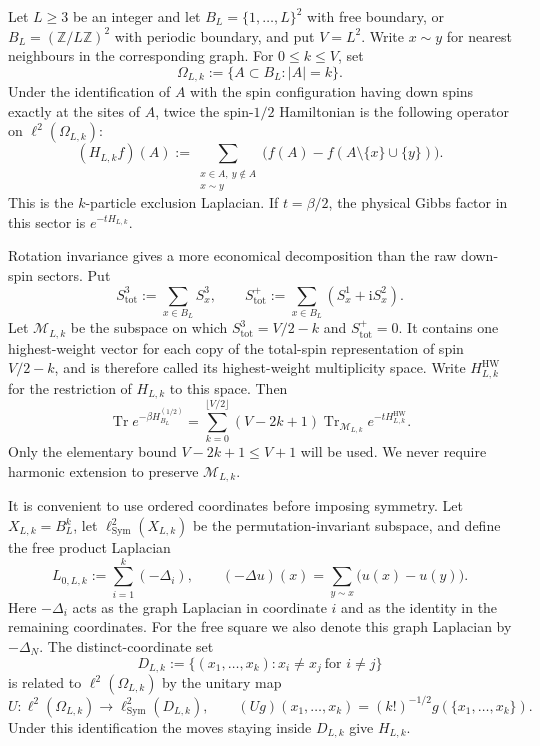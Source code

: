 \documentclass[11pt]{article}
\numberwithin{equation}{section}
\theoremstyle{remark}
\newcommand{\Z}{\mathbb Z}
\newcommand{\Tr}{\operatorname{Tr}}
\newcommand{\1}{\mathbf 1}
\newcommand{\cM}{\mathcal M}
\newcommand{\Sym}{\operatorname{Sym}}
\newcommand{\HW}{\mathrm{HW}}
\begin{document}
Let \(L\geq3\) be an integer and let
\(B_L=\{1,\ldots,L\}^2\) with free boundary, or
\(B_L=(\Z/L\Z)^2\) with periodic boundary, and put \(V=L^2\).  Write
\(x\sim y\) for nearest neighbours in the corresponding graph.  For
\(0\leq k\leq V\), set
\[
 \Omega_{L,k}:=\{A\subset B_L:|A|=k\}.
\]
Under the identification of \(A\) with the spin configuration having down
spins exactly at the sites of \(A\), twice the spin-\(1/2\) Hamiltonian is
the following operator on \(\ell^2(\Omega_{L,k})\):
\begin{equation}
 (H_{L,k}f)(A)
 :=\sum_{\substack{x\in A,\ y\notin A\\x\sim y}}
 \bigl(f(A)-f(A\setminus\{x\}\cup\{y\})\bigr).
 \label{eq:exclusion-laplacian}
\end{equation}
This is the \(k\)-particle exclusion Laplacian.  If \(t=\beta/2\), the
physical Gibbs factor in this sector is
\(e^{-tH_{L,k}}\).

Rotation invariance gives a more economical decomposition than the raw
down-spin sectors.  Put
\[
 S^3_{\mathrm{tot}}:=\sum_{x\in B_L}S_x^3,\qquad
 S^+_{\mathrm{tot}}:=\sum_{x\in B_L}(S_x^1+\mathrm iS_x^2).
\]
Let \(\cM_{L,k}\) be the subspace on which
\(S^3_{\mathrm{tot}}=V/2-k\) and \(S^+_{\mathrm{tot}}=0\).  It contains
one highest-weight vector for each copy of the total-spin representation
of spin \(V/2-k\), and is therefore called its highest-weight multiplicity
space.  Write \(H_{L,k}^{\HW}\) for the restriction of \(H_{L,k}\) to
this space.
Then
\begin{equation}
 \Tr e^{-\beta H_{B_L}^{(1/2)}}
 =\sum_{k=0}^{\lfloor V/2\rfloor}
 (V-2k+1)\Tr_{\cM_{L,k}}e^{-tH_{L,k}^{\HW}}.
 \label{eq:su2-trace-decomposition}
\end{equation}
Only the elementary bound \(V-2k+1\leq V+1\) will be used.  We never
require harmonic extension to preserve \(\cM_{L,k}\).

It is convenient to use ordered coordinates before imposing symmetry.  Let
\(X_{L,k}=B_L^k\), let \(\ell^2_{\Sym}(X_{L,k})\) be the permutation-invariant
subspace, and define the free product Laplacian
\begin{equation}
 L_{0,L,k}:=\sum_{i=1}^k(-\Delta_i),
 \qquad
 (-\Delta u)(x)=\sum_{y\sim x}\bigl(u(x)-u(y)\bigr).
 \label{eq:free-product-laplacian}
\end{equation}
Here \(-\Delta_i\) acts as the graph Laplacian in coordinate \(i\) and as
the identity in the remaining coordinates.
For the free square we also denote this graph Laplacian by
\(-\Delta_N\).
The distinct-coordinate set
\[
 D_{L,k}:=\{(x_1,\ldots,x_k):x_i\ne x_j\ \text{for }i\ne j\}
\]
is related to \(\ell^2(\Omega_{L,k})\) by the unitary map
\[
 U:\ell^2(\Omega_{L,k})\longrightarrow\ell^2_{\Sym}(D_{L,k}),
 \qquad
 (Ug)(x_1,\ldots,x_k)
 =(k!)^{-1/2}g(\{x_1,\ldots,x_k\}).
\]
Under this identification the moves staying inside \(D_{L,k}\) give
\(H_{L,k}\).
\end{document}
